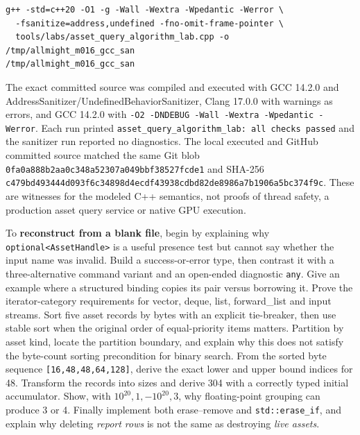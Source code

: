 \begin{verbatim}
g++ -std=c++20 -O1 -g -Wall -Wextra -Wpedantic -Werror \
  -fsanitize=address,undefined -fno-omit-frame-pointer \
  tools/labs/asset_query_algorithm_lab.cpp -o /tmp/allmight_m016_gcc_san
/tmp/allmight_m016_gcc_san
\end{verbatim}

The exact committed source was compiled and executed with GCC 14.2.0 and AddressSanitizer/UndefinedBehaviorSanitizer, Clang 17.0.0 with warnings as errors, and GCC 14.2.0 with \texttt{-O2\ -DNDEBUG\ -Wall\ -Wextra\ -Wpedantic\ -Werror}. Each run printed \texttt{asset\_query\_algorithm\_lab:\ all\ checks\ passed} and the sanitizer run reported no diagnostics. The local executed and GitHub committed source matched the same Git blob \texttt{0fa0a888b2aa0c348a52307a049bbf38527fcde1} and SHA-256 \texttt{c479bd493444d093f6c34898d4ecdf43938cdbd82de8986a7b1906a5bc374f9c}. These are witnesses for the modeled C++ semantics, not proofs of thread safety, a production asset query service or native GPU execution.

To \textbf{reconstruct from a blank file}, begin by explaining why \texttt{optional\textless{}AssetHandle\textgreater{}} is a useful presence test but cannot say whether the input name was invalid. Build a success-or-error type, then contrast it with a three-alternative command variant and an open-ended diagnostic \texttt{any}. Give an example where a structured binding copies its pair versus borrowing it. Prove the iterator-category requirements for vector, deque, list, forward\_list and input streams. Sort five asset records by bytes with an explicit tie-breaker, then use stable sort when the original order of equal-priority items matters. Partition by asset kind, locate the partition boundary, and explain why this does not satisfy the byte-count sorting precondition for binary search. From the sorted byte sequence \texttt{{[}16,48,48,64,128{]}}, derive the exact lower and upper bound indices for 48. Transform the records into sizes and derive 304 with a correctly typed initial accumulator. Show, with \(10^{20},1,-10^{20},3\), why floating-point grouping can produce 3 or 4. Finally implement both erase--remove and \texttt{std::erase\_if}, and explain why deleting \emph{report rows} is not the same as destroying \emph{live assets}.

